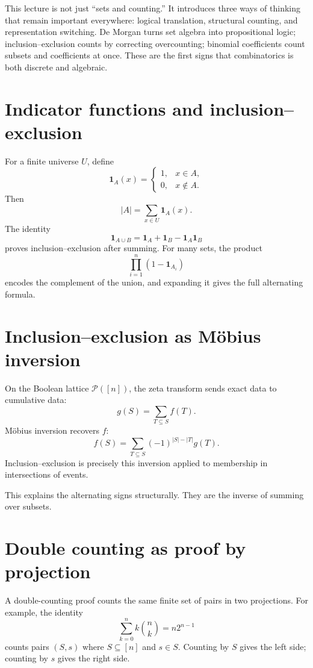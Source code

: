 This lecture is not just ``sets and counting.''  It introduces three ways of thinking that remain important everywhere: logical translation, structural counting, and representation switching.  De Morgan turns set algebra into propositional logic; inclusion--exclusion counts by correcting overcounting; binomial coefficients count subsets and coefficients at once.  These are the first signs that combinatorics is both discrete and algebraic.

\section{Indicator functions and inclusion--exclusion}

For a finite universe \(U\), define
\[
  \mathbf 1_A(x)=
  \begin{cases}
  1,&x\in A,\\
  0,&x\notin A.
  \end{cases}
\]
Then
\[
  |A|=\sum_{x\in U}\mathbf 1_A(x).
\]
The identity
\[
  \mathbf 1_{A\cup B}=\mathbf 1_A+\mathbf 1_B-\mathbf 1_A\mathbf 1_B
\]
proves inclusion--exclusion after summing.  For many sets, the product
\[
  \prod_{i=1}^n(1-\mathbf 1_{A_i})
\]
encodes the complement of the union, and expanding it gives the full alternating formula.

\section{Inclusion--exclusion as Möbius inversion}

On the Boolean lattice \(\mathcal P([n])\), the zeta transform sends exact data to cumulative data:
\[
  g(S)=\sum_{T\subseteq S}f(T).
\]
Möbius inversion recovers \(f\):
\[
  f(S)=\sum_{T\subseteq S}(-1)^{|S|-|T|}g(T).
\]
Inclusion--exclusion is precisely this inversion applied to membership in intersections of events.

This explains the alternating signs structurally.  They are the inverse of summing over subsets.

\section{Double counting as proof by projection}

A double-counting proof counts the same finite set of pairs in two projections.  For example, the identity
\[
  \sum_{k=0}^n k\binom nk=n2^{n-1}
\]
counts pairs \((S,s)\) where \(S\subseteq[n]\) and \(s\in S\).  Counting by \(S\) gives the left side; counting by \(s\) gives the right side.

